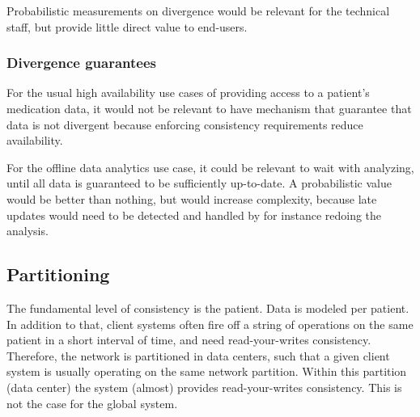\documentclass[11pt,a4paper]{report}
\begin{document}
Probabilistic measurements on divergence would be relevant for the technical staff, but provide little direct value to end-users.
\subsubsection{Divergence guarantees}
For the usual high availability use cases of providing access to a patient's medication data, it would not be relevant to have mechanism that guarantee that data is not divergent because enforcing consistency requirements reduce availability.

For the offline data analytics use case, it could be relevant to wait with analyzing, until all data is guaranteed to be sufficiently up-to-date. A probabilistic value would be better than nothing, but would increase complexity, because late updates would need to be detected and handled by for instance redoing the analysis.

\subsection{Partitioning}
The fundamental level of consistency is the patient. Data is modeled per patient. 
In addition to that, client systems often fire off a string of operations on the same patient in a short interval of time, and need read-your-writes consistency. Therefore, the network is partitioned in data centers, such that a given client system is usually operating on the same network partition. Within this partition (data center) the system (almost) provides read-your-writes consistency. This is not the case for the global system.
\end{document}
